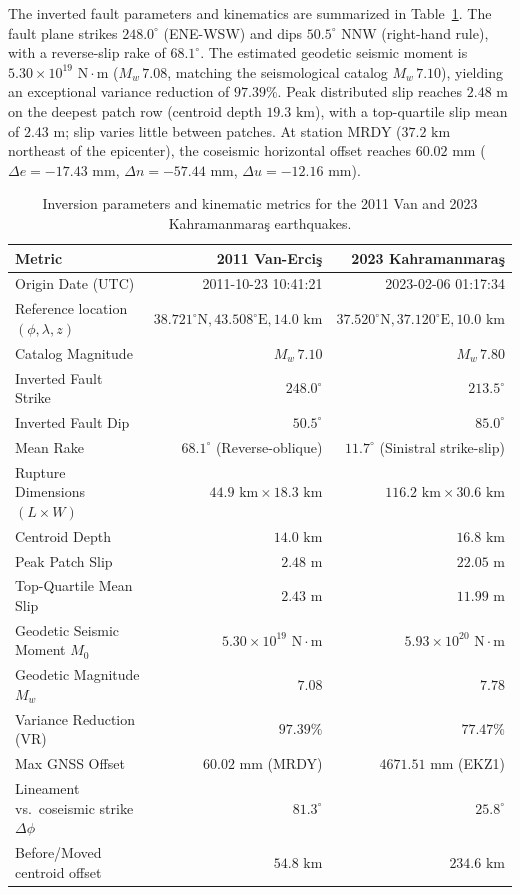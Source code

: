 \documentclass[11pt,a4paper]{article}
\begin{document}
The inverted fault parameters and kinematics are summarized in Table~\ref{tab:fault_params}. The fault plane strikes $248.0^\circ$ (ENE-WSW) and dips $50.5^\circ$ NNW (right-hand rule), with a reverse-slip rake of $68.1^\circ$. The estimated geodetic seismic moment is $5.30 \times 10^{19}\text{ N}\cdot\text{m}$ ($M_w\,7.08$, matching the seismological catalog $M_w\,7.10$), yielding an exceptional variance reduction of $97.39\%$. Peak distributed slip reaches $2.48\text{ m}$ on the deepest patch row (centroid depth $19.3\text{ km}$), with a top-quartile slip mean of $2.43\text{ m}$; slip varies little between patches. At station MRDY ($37.2\text{ km}$ northeast of the epicenter), the coseismic horizontal offset reaches $60.02\text{ mm}$ ($\Delta e = -17.43\text{ mm}$, $\Delta n = -57.44\text{ mm}$, $\Delta u = -12.16\text{ mm}$).

\begin{table}[htbp]
\centering
\caption{Inversion parameters and kinematic metrics for the 2011 Van and 2023 Kahramanmara\c{s} earthquakes.}
\label{tab:fault_params}
\begin{tabular}{lrr}
\toprule
Metric & 2011 Van-Erci\c{s} & 2023 Kahramanmara\c{s} \\
\midrule
Origin Date (UTC) & 2011-10-23 10:41:21 & 2023-02-06 01:17:34 \\
Reference location $(\phi, \lambda, z)$ & $38.721^\circ\text{N}, 43.508^\circ\text{E}, 14.0\text{ km}$ & $37.520^\circ\text{N}, 37.120^\circ\text{E}, 10.0\text{ km}$ \\
Catalog Magnitude & $M_w\,7.10$ & $M_w\,7.80$ \\
Inverted Fault Strike & $248.0^\circ$ & $213.5^\circ$ \\
Inverted Fault Dip & $50.5^\circ$ & $85.0^\circ$ \\
Mean Rake & $68.1^\circ$ (Reverse-oblique) & $11.7^\circ$ (Sinistral strike-slip) \\
Rupture Dimensions $(L \times W)$ & $44.9\text{ km} \times 18.3\text{ km}$ & $116.2\text{ km} \times 30.6\text{ km}$ \\
Centroid Depth & $14.0\text{ km}$ & $16.8\text{ km}$ \\
Peak Patch Slip & $2.48\text{ m}$ & $22.05\text{ m}$ \\
Top-Quartile Mean Slip & $2.43\text{ m}$ & $11.99\text{ m}$ \\
Geodetic Seismic Moment $M_0$ & $5.30 \times 10^{19}\text{ N}\cdot\text{m}$ & $5.93 \times 10^{20}\text{ N}\cdot\text{m}$ \\
Geodetic Magnitude $M_w$ & $7.08$ & $7.78$ \\
Variance Reduction (VR) & $97.39\%$ & $77.47\%$ \\
Max GNSS Offset & $60.02\text{ mm}$ (MRDY) & $4671.51\text{ mm}$ (EKZ1) \\
Lineament vs.\ coseismic strike $\Delta \phi$ & $81.3^\circ$ & $25.8^\circ$ \\
Before/Moved centroid offset & $54.8\text{ km}$ & $234.6\text{ km}$ \\
\bottomrule
\end{tabular}
\end{table}
\end{document}
